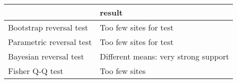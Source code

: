 \begin{tabular}{ll}
\toprule
{} &                                result \\
\midrule
Bootstrap reversal test  &                Too few sites for test \\
Parametric reversal test &                Too few sites for test \\
Bayesian reversal test   &  Different means: very strong support \\
Fisher Q-Q test          &                         Too few sites \\
\bottomrule
\end{tabular}
